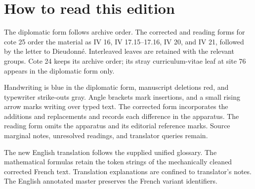 \documentclass[10pt,a4paper]{article}
\begin{document}
\clearpage\section*{How to read this edition}
The diplomatic form follows archive order. The corrected and reading forms for cote 25 order the material as IV 16, IV 17.15--17.16, IV 20, and IV 21, followed by the letter to Dieudonné. Interleaved leaves are retained with the relevant groups. Cote 24 keeps its archive order; its stray curriculum-vitae leaf at site 76 appears in the diplomatic form only.

Handwriting is blue in the diplomatic form, manuscript deletions red, and typewriter strike-outs gray. Angle brackets mark insertions, and a small rising arrow marks writing over typed text. The corrected form incorporates the additions and replacements and records each difference in the apparatus. The reading form omits the apparatus and its editorial reference marks. Source marginal notes, unresolved readings, and translator queries remain.

The new English translation follows the supplied unified glossary. The mathematical formulas retain the token strings of the mechanically cleaned corrected French text. Translation explanations are confined to translator's notes. The English annotated master preserves the French variant identifiers.
\end{document}
